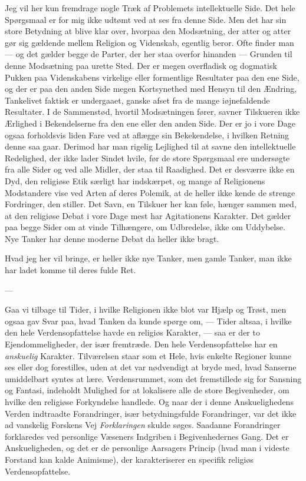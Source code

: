 \documentclass[12pt,a4paper]{article}
\newcommand{\opage}[1]{\marginnote{\footnotesize\textit{[#1]}}}
\begin{document}
Jeg vil her kun fremdrage nogle Træk af Problemets intellektuelle Side.
Det hele Spørgsmaal er for mig ikke udtømt ved at ses fra denne Side. Men
det har sin store Betydning at blive klar over, hvorpaa den Modsætning,
der atter og atter gør sig gældende mellem Religion og Videnskab, egentlig
beror. Ofte finder man --- og det gælder begge de Parter, der her staa
overfor hinanden --- Grunden til denne Modsætning paa urette Sted. Der er
megen overfladisk og dogmatisk Pukken paa Videnskabens virkelige eller
formentlige Resultater paa den ene Side, og der er paa den anden Side
megen Kortsynethed med Hensyn til den Ændring, Tankelivet faktisk er
undergaaet, ganske afset fra de mange iøjnefaldende Resultater. I de
Sammenstød, hvortil Modsætningen fører, savner Tilskueren ikke Ærlighed i
Bekendelserne fra den ene eller den anden Side. Der er jo i vore Dage
ogsaa forholdsvis liden Fare ved at aflægge
\opage{3}sin Bekekendelse, i hvilken
Retning denne saa gaar. Derimod har man rigelig Lejlighed til at savne den
intellektuelle Redelighed, der ikke lader Sindet hvile, før de store
Spørgsmaal ere undersøgte fra alle Sider og ved alle Midler, der staa til
Raadighed. Det er desværre ikke en Dyd, den religiøse Etik særligt har
indskærpet, og mange af Religionens Modstandere vise ved Arten af deres
Polemik, at de heller ikke kende de strenge Fordringer, den stiller. Det
Savn, en Tilskuer her kan føle, hænger sammen med, at den religiøse Debat
i vore Dage mest har Agitationens Karakter. Det gælder paa begge Sider om
at vinde Tilhængere, om Udbredelse, ikke om Uddybelse. Nye Tanker har
denne moderne Debat da heller ikke bragt.

Hvad jeg her vil bringe, er heller ikke nye Tanker, men gamle Tanker, man
ikke har ladet komme til deres fulde Ret.

\begin{center}---\end{center}

Gaa vi tilbage til Tider, i hvilke Religionen ikke blot var Hjælp og
Trøst, men ogsaa gav Svar paa, hvad Tanken da kunde spørge om, --- Tider
altsaa, i hvilke den hele Verdensopfattelse havde en religiøs Karakter,
--- saa er der to Ejendommeligheder, der især fremtræde. Den hele
Verdensopfattelse har en \emph{anskuelig} Karakter. Tilværelsen staar som et
Hele, hvis enkelte Regioner kunne ses eller dog forestilles, uden at det
var nødvendigt at bryde med, hvad Sanserne umiddelbart syntes at lære.
Verdensrummet, som det fremstillede sig for Sansning og Fantasi, indeholdt
Mulighed for at lokalisere alle de store Begivenheder, om hvilke den
religiøse Forkyndelse handlede. Og naar der i denne Anskuelighedens Verden
indtraadte Forandringer, især betydningsfulde Forandringer, var det ikke
ad vanskelig Forskens Vej \emph{Forklaringen} skulde søges. Saadanne
Forandringer forklaredes ved personlige Væseners Indgriben \opage{4} i
Begivenhedernes Gang. Det er Anskueligheden, og det er de personlige
Aarsagers Princip (hvad man i videste Forstand kan kalde Animisme), der
karakteriserer en specifik religiøs Verdensopfattelse.
\end{document}
